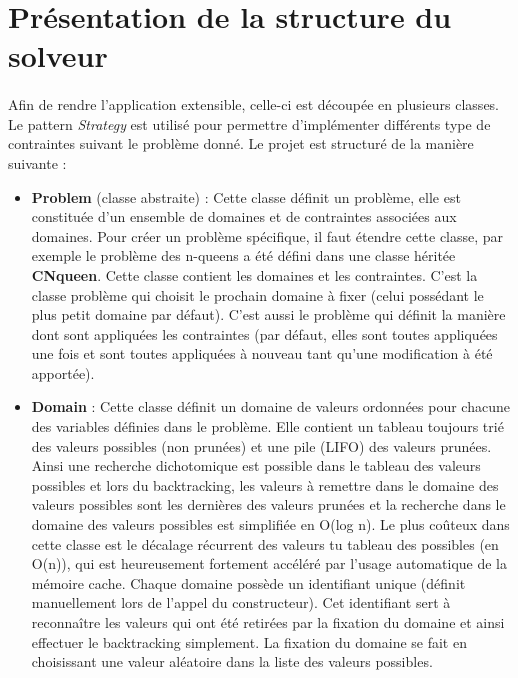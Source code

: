 \section{Présentation de la structure du solveur}

\paragraph{}
Afin de rendre l'application extensible, celle-ci est découpée en plusieurs classes. Le pattern \textit{Strategy} est utilisé pour permettre d'implémenter différents type de contraintes suivant le problème donné. Le projet est structuré de la manière suivante :

\begin{itemize}
    \item \textbf{Problem} (classe abstraite) : Cette classe définit un problème, elle est constituée d'un ensemble de domaines et de contraintes associées aux domaines. Pour créer un problème spécifique, il faut étendre cette classe, par exemple le problème des n-queens a été défini dans une classe héritée \textbf{CNqueen}. Cette classe contient les domaines et les contraintes. C'est la classe problème qui choisit le prochain domaine à fixer (celui possédant le plus petit domaine par défaut). C'est aussi le problème qui définit la manière dont sont appliquées les contraintes (par défaut, elles sont toutes appliquées une fois et sont toutes appliquées à nouveau tant qu'une modification à été apportée).
    
    \item \textbf{Domain} : Cette classe définit un domaine de valeurs ordonnées pour chacune des variables définies dans le problème. Elle contient un tableau toujours trié des valeurs possibles (non prunées) et une pile (LIFO) des valeurs prunées. Ainsi une recherche dichotomique est possible dans le tableau des valeurs possibles et lors du backtracking, les valeurs à remettre dans le domaine des valeurs possibles sont les dernières des valeurs prunées et la recherche dans le domaine des valeurs possibles est simplifiée en O(log n). Le plus coûteux dans cette classe est le décalage récurrent des valeurs tu tableau des possibles (en O(n)), qui est heureusement fortement accéléré par l'usage automatique de la mémoire cache. Chaque domaine possède un identifiant unique (définit manuellement lors de l'appel du constructeur). Cet identifiant sert à reconnaître les valeurs qui ont été retirées par la fixation du domaine et ainsi effectuer le backtracking simplement. La fixation du domaine se fait en choisissant une valeur aléatoire dans la liste des valeurs possibles.
    

\end{itemize}
